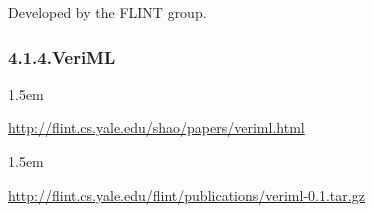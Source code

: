 \documentclass[12pt,twoside]{article}
\begin{document}
\noindent{}Developed by the FLINT group.%

\subsubsection{4.1.4.\hspace*{0.5em}VeriML}\label{sec-veriml}%

\begin{mddefinitions}%


\begin{mdbmarginx}{}{}{}{1.5em}%
\begin{mddefdata}%
\href{http://flint.cs.yale.edu/shao/papers/veriml.html}{{\ttfamily http://\hspace{0pt}flint.\hspace{0pt}cs.\hspace{0pt}yale.\hspace{0pt}edu/\hspace{0pt}shao/\hspace{0pt}papers/\hspace{0pt}veriml.\hspace{0pt}html}}
\end{mddefdata}%
\end{mdbmarginx}%


\begin{mdbmarginx}{}{}{}{1.5em}%
\begin{mddefdata}%
\href{http://flint.cs.yale.edu/flint/publications/veriml-0.1.tar.gz}{{\ttfamily http://\hspace{0pt}flint.\hspace{0pt}cs.\hspace{0pt}yale.\hspace{0pt}edu/\hspace{0pt}flint/\hspace{0pt}publications/\hspace{0pt}veriml-\hspace{0pt}0.\hspace{0pt}1.\hspace{0pt}tar.\hspace{0pt}gz}}
\end{mddefdata}%
\end{mdbmarginx}%


\end{mddefinitions}
\end{document}
